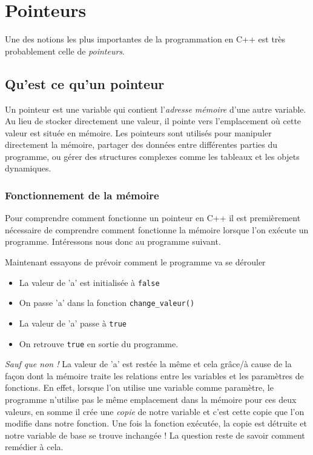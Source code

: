 \chapter{Pointeurs}
Une des notions les plus importantes de la programmation en C++ est très probablement celle de \emph{pointeurs}.

\section{Qu'est ce qu'un pointeur}
Un pointeur est une variable qui contient l’\emph{adresse mémoire} d’une autre variable. Au lieu de stocker directement une valeur, il pointe vers l’emplacement où cette valeur est située en mémoire. Les pointeurs sont utilisés pour manipuler directement la mémoire, partager des données entre différentes parties du programme, ou gérer des structures complexes comme les tableaux et les objets dynamiques.

\subsection{Fonctionnement de la mémoire}
Pour comprendre comment fonctionne un pointeur en C++ il est premièrement nécessaire de comprendre comment fonctionne la mémoire lorsque l'on exécute un programme. Intéressons nous donc au programme suivant.



Maintenant essayons de prévoir comment le programme va se dérouler

\begin{itemize}
	\item La valeur de 'a' est initialisée à \lstinline|false|
	\item On passe 'a' dans la fonction \lstinline|change_valeur()|
	\item La valeur de 'a' passe à \lstinline|true|
	\item On retrouve \lstinline|true| en sortie du programme.
\end{itemize} 

\emph{Sauf que non !} La valeur de 'a' est restée la même et cela grâce/à cause de la façon dont la mémoire traite les relations entre les variables et les paramètres de fonctions. En effet, lorsque l'on utilise une variable comme paramètre, le programme n'utilise pas le même emplacement dans la mémoire pour ces deux valeurs, en somme il crée une \emph{copie} de notre variable et c'est cette copie que l'on modifie dans notre fonction. Une fois la fonction exécutée, la copie est détruite et notre variable de base se trouve inchangée ! La question reste de savoir comment remédier à cela.

